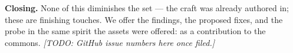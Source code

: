 \documentclass[10pt]{article}
\begin{document}
\vspace{0.5ex}
\noindent\textbf{Closing.} None of this diminishes the set --- the craft was already
authored in; these are finishing touches. We offer the findings, the proposed fixes, and
the probe in the same spirit the assets were offered: as a contribution to the commons.
\textit{[TODO: GitHub issue numbers here once filed.]}
\end{document}
